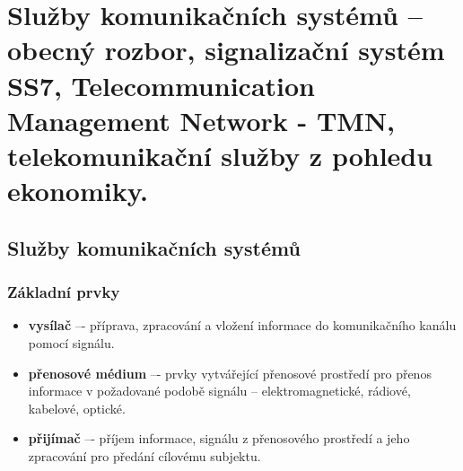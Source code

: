\section{Služby komunikačních systémů – obecný rozbor, signalizační systém SS7, Telecommunication Management Network - TMN, telekomunikační služby z pohledu ekonomiky.}

\subsection{Služby komunikačních systémů}

\subsubsection{Základní prvky}
\begin{itemize}
    \item \textbf{vysílač} –- příprava, zpracování a vložení informace do komunikačního kanálu pomocí signálu.
 \item \textbf{přenosové médium} –- prvky vytvářející přenosové prostředí pro přenos informace v požadované podobě signálu – elektromagnetické, rádiové, kabelové, optické.
 \item \textbf{přijímač} –- příjem informace, signálu z přenosového prostředí a jeho zpracování pro předání cílovému subjektu.
\end{itemize}

